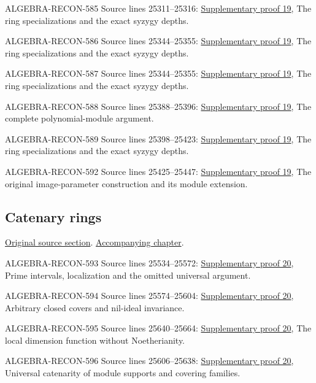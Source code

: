 \begin{AlgebraSourceRoutes}
\item[ALGEBRA-RECON-585] Source lines 25311--25316: \hyperlink{algebra_cm_modules_notes_20260928}{Supplementary proof 19}, The ring specializations and the exact syzygy depths.
\item[ALGEBRA-RECON-586] Source lines 25344--25355: \hyperlink{algebra_cm_modules_notes_20260928}{Supplementary proof 19}, The ring specializations and the exact syzygy depths.
\item[ALGEBRA-RECON-587] Source lines 25344--25355: \hyperlink{algebra_cm_modules_notes_20260928}{Supplementary proof 19}, The ring specializations and the exact syzygy depths.
\item[ALGEBRA-RECON-588] Source lines 25388--25396: \hyperlink{algebra_cm_modules_notes_20260928}{Supplementary proof 19}, The complete polynomial-module argument.
\item[ALGEBRA-RECON-589] Source lines 25398--25423: \hyperlink{algebra_cm_modules_notes_20260928}{Supplementary proof 19}, The ring specializations and the exact syzygy depths.
\item[ALGEBRA-RECON-592] Source lines 25425--25447: \hyperlink{algebra_cm_modules_notes_20260928}{Supplementary proof 19}, The original image-parameter construction and its module extension.
\end{AlgebraSourceRoutes}

\subsection{Catenary rings}
\hypertarget{algebra-source-section-catenary}{}
\noindent\href{https://github.com/stacks/stacks-project/blob/a04446e57ec1fbc252a871afcec7752fb2807b14/algebra.tex\#L25456}{Original source section}. \href{algebra.pdf\#nameddest=section-catenary}{Accompanying chapter}.

\begin{AlgebraSourceRoutes}
\item[ALGEBRA-RECON-593] Source lines 25534--25572: \hyperlink{algebra_catenary_regular_notes_20260928}{Supplementary proof 20}, Prime intervals, localization and the omitted universal argument.
\item[ALGEBRA-RECON-594] Source lines 25574--25604: \hyperlink{algebra_catenary_regular_notes_20260928}{Supplementary proof 20}, Arbitrary closed covers and nil-ideal invariance.
\item[ALGEBRA-RECON-595] Source lines 25640--25664: \hyperlink{algebra_catenary_regular_notes_20260928}{Supplementary proof 20}, The local dimension function without Noetherianity.
\item[ALGEBRA-RECON-596] Source lines 25606--25638: \hyperlink{algebra_catenary_regular_notes_20260928}{Supplementary proof 20}, Universal catenarity of module supports and covering families.
\end{AlgebraSourceRoutes}


